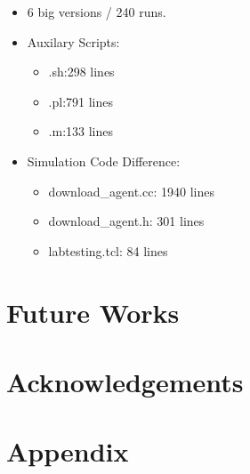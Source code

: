 \documentclass[11pt,a4paper]{article}
\begin{document}
\begin{itemize}
	\item 6 big versions / 240 runs. 
	\item Auxilary Scripts:
	\begin{itemize}
	\item .sh:298 lines
	\item .pl:791  lines
	\item .m:133 lines
	\end{itemize}
	\item Simulation Code Difference:	
	\begin{itemize}
		\item download\_agent.cc: 1940 lines
		\item download\_agent.h: 301 lines
		\item labtesting.tcl: 84 lines
	\end{itemize}
\end{itemize}


\section{Future Works}





\section*{Acknowledgements}




\pagebreak
\section*{Appendix}


\pagebreak
{}

\end{document}

